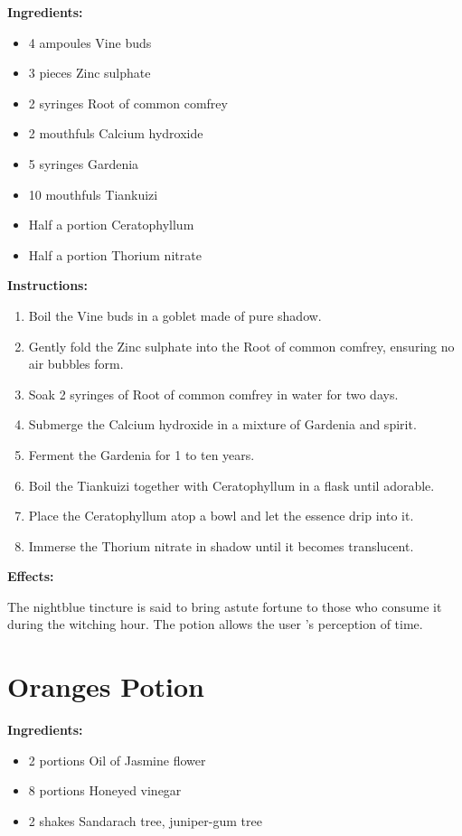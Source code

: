 \documentclass{article}
\begin{document}
\textbf{Ingredients:}

\begin{itemize}
  \item 4 ampoules Vine buds
  \item 3 pieces Zinc sulphate
  \item 2 syringes Root of common comfrey
  \item 2 mouthfuls Calcium hydroxide
  \item 5 syringes Gardenia
  \item 10 mouthfuls Tiankuizi
  \item Half a portion Ceratophyllum
  \item Half a portion Thorium nitrate
\end{itemize}

\textbf{Instructions:}

\begin{enumerate}
  \item Boil the Vine buds in a goblet made of pure shadow.
  \item Gently fold the Zinc sulphate into the Root of common comfrey, ensuring no air bubbles form.
  \item Soak 2 syringes of Root of common comfrey in water for two days.
  \item Submerge the Calcium hydroxide in a mixture of Gardenia and spirit.
  \item Ferment the Gardenia for 1 to ten years.
  \item Boil the Tiankuizi together with Ceratophyllum in a flask until adorable.
  \item Place the Ceratophyllum atop a bowl and let the essence drip into it.
  \item Immerse the Thorium nitrate in shadow until it becomes translucent.
\end{enumerate}

\textbf{Effects:}

The nightblue tincture is said to bring astute fortune to those who consume it during the witching hour. The potion allows the user 's perception of time.

\newpage
\section*{Oranges Potion}

\textbf{Ingredients:}

\begin{itemize}
  \item 2 portions Oil of Jasmine flower
  \item 8 portions Honeyed vinegar
  \item 2 shakes Sandarach tree, juniper-gum tree
\end{itemize}
\end{document}
